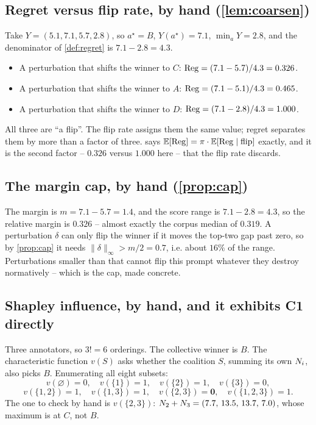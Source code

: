 \subsection{Regret versus flip rate, by hand (\cref{lem:coarsen})}

Take $Y=(5.1,7.1,5.7,2.8)$, so $a^\star = B$, $Y(a^\star)=7.1$, $\min_a Y = 2.8$,
and the denominator of \cref{def:regret} is $7.1-2.8=4.3$.

\begin{itemize}
\item A perturbation that shifts the winner to $C$: $\mathrm{Reg} = (7.1-5.7)/4.3 = 0.326$.
\item A perturbation that shifts the winner to $A$: $\mathrm{Reg} = (7.1-5.1)/4.3 = 0.465$.
\item A perturbation that shifts the winner to $D$: $\mathrm{Reg} = (7.1-2.8)/4.3 = 1.000$.
\end{itemize}
All three are ``a flip''. The flip rate assigns them the same value; regret
separates them by more than a factor of three.  says
$\mathbb{E}[\mathrm{Reg}] = \pi \cdot \mathbb{E}[\mathrm{Reg}\mid\text{flip}]$ exactly, and it is the second
factor -- $0.326$ versus $1.000$ here -- that the flip rate discards.

\subsection{The margin cap, by hand (\cref{prop:cap})}

The margin is $m = 7.1-5.7 = 1.4$, and the score range is $7.1-2.8=4.3$, so the
relative margin is $0.326$ -- almost exactly the corpus median of $0.319$. A
perturbation $\delta$ can only flip the winner if it moves the top-two gap past
zero, so by \cref{prop:cap} it needs $\|\delta\|_\infty > m/2 = 0.7$, i.e. about
$16\%$ of the range. Perturbations smaller than that cannot flip this prompt
whatever they destroy normatively -- which is the cap, made concrete.

\subsection{Shapley influence, by hand, and it exhibits C1 directly}

Three annotators, so $3! = 6$ orderings. The collective winner is $B$.
The characteristic function $v(S)$ asks whether the coalition $S$, summing its own
$N_i$, also picks $B$. Enumerating all eight subsets:
\[
v(\varnothing)=0,\quad v(\{1\})=1,\quad v(\{2\})=1,\quad v(\{3\})=0,
\]
\[
v(\{1,2\})=1,\quad v(\{1,3\})=1,\quad v(\{2,3\})=\mathbf{0},\quad v(\{1,2,3\})=1 .
\]
The one to check by hand is $v(\{2,3\})$:
$N_2+N_3 = (7.7,\,13.5,\,13.7,\,7.0)$, whose maximum is at $C$, not $B$.

